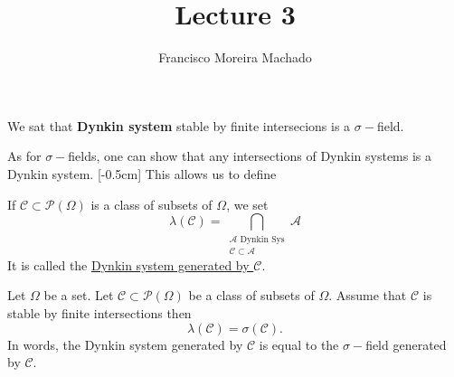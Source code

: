 \documentclass[../main.tex]{subfiles}
\author{Francisco Moreira Machado}
\title{Lecture 3}
\begin{document}
We sat that \textbf{Dynkin system} stable by finite intersecions is a $\sigma-$field.

As for $\sigma-$fields, one can show that any intersections of Dynkin systems is a Dynkin
system. [-0.5cm] This allows us to define

\begin{definition}
    If $\mathcal{C} \subset \mathcal{P}(\Omega)$ is a class of subsets of $\Omega$, we set
    $$\lambda(\mathcal{C}) = \bigcap_{\substack{\mathcal{A} \text{ Dynkin Sys} \\ \mathcal{C}
    \subset \mathcal{A}}} \mathcal{A}$$
    It is called the \underline{Dynkin system generated by $\mathcal{C}$}.
\end{definition}

\begin{theorem*}
  Let $\Omega$ be a set. Let $\mathcal{C} \subset \mathcal{P}(\Omega)$ be a class of subsets of
  $\Omega$. Assume that $\mathcal{C}$ is stable by finite intersections then
  \[
  \lambda(\mathcal{C}) = \sigma(\mathcal{C})
  .\] 
  In words, the Dynkin system generated by $\mathcal{C}$ is equal to the $\sigma-$field
  generated by $\mathcal{C}$.
\end{theorem*}
\end{document}
